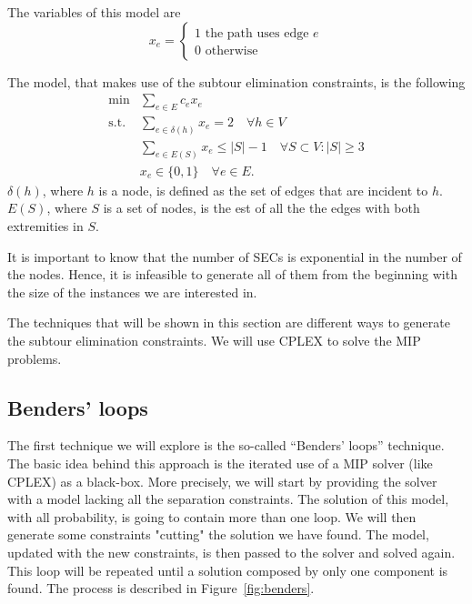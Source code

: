 \documentclass{article}
\begin{document}
The variables of this model are
\begin{equation*}
        x_e =
        \left\{
                \begin{array}{l}
                1 \text{ the path uses edge $e$}\\
                0 \text{ otherwise }
        \end{array}
        \right.
\end{equation*}

The model, that makes use of the subtour elimination constraints, is the
following
\begin{equation}
  \begin{aligned}
\min & \sum_{e \in E} c_e x_e \\
\text{s.t.}
& \sum_{e \in \delta(h)} x_{e} = 2 \quad \forall h \in V \\
& \sum_{e \in E(S)} x_{e} \leq |S| - 1 \quad \forall S \subset V : |S| \geq 3 \\
& x_{e} \in \{0, 1\} \quad \forall e \in E.
\end{aligned}
\end{equation}
$\delta(h)$, where $h$ is a node, is defined as the set of edges that are
incident to $h$. $E(S)$, where $S$ is a set of nodes, is the est of all the
the edges with both extremities in $S$.

It is important to know that the number of SECs is exponential in the number of
the nodes. Hence, it is infeasible to generate all of them from the beginning
with the size of the instances we are interested in.

The techniques that will be shown in this section are different ways to generate
the subtour elimination constraints. We will use CPLEX to solve the MIP
problems.
\subsection{Benders' loops}
\label{ssec:benders}
The first technique we will explore is the so-called ``Benders' loops'' technique.
The basic idea behind this approach is the iterated use of a MIP solver (like CPLEX)
as a black-box. More precisely, we will start by providing the solver with
a model lacking all the separation constraints. The solution of this model,
with all probability, is going to contain more than one loop. We will then
generate some constraints "cutting" the solution we have found.
The model, updated with the new constraints, is then passed to the solver
and solved again. This loop will be repeated until a solution composed by
only one component is found.
The process is described in Figure~\ref{fig:benders}.
\end{document}
